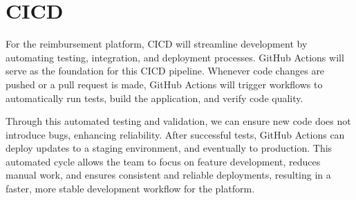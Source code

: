 \documentclass{article}
\begin{document}

\section{CICD}

For the reimbursement platform, CICD will streamline development by automating testing, integration, and deployment processes. GitHub Actions will serve as the foundation for this CICD pipeline. Whenever code changes are pushed or a pull request is made, GitHub Actions will trigger workflows to automatically run tests, build the application, and verify code quality.

Through this automated testing and validation, we can ensure new code does not introduce bugs, enhancing reliability. After successful tests, GitHub Actions can deploy updates to a staging environment, and eventually to production. This automated cycle allows the team to focus on feature development, reduces manual work, and ensures consistent and reliable deployments, resulting in a faster, more stable development workflow for the platform.


\end{document}
